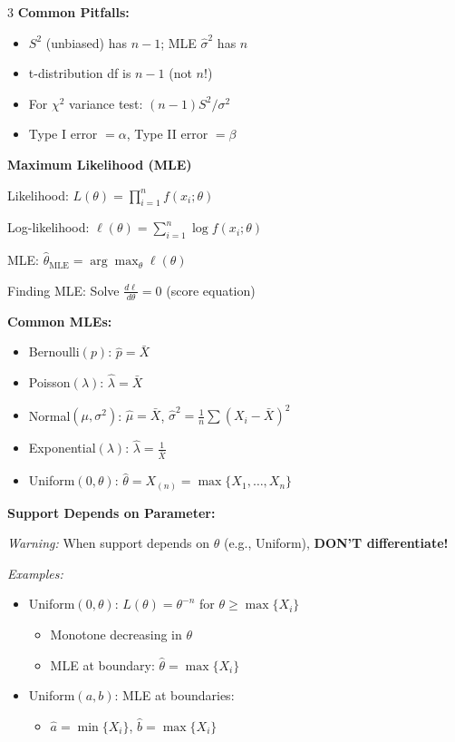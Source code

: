 \documentclass[10pt,letterpaper]{article}
\begin{document}
\begin{multicols}{3}
\textbf{Common Pitfalls:}
\begin{itemize}
\item $S^2$ (unbiased) has $n-1$; MLE $\hat{\sigma}^2$ has $n$
\item t-distribution df is $n-1$ (not $n$!)
\item For $\chi^2$ variance test: $(n-1)S^2/\sigma^2$
\item Type I error $= \alpha$, Type II error $= \beta$
\end{itemize}

\textbf{Maximum Likelihood (MLE)}

Likelihood: $L(\theta) = \prod_{i=1}^n f(x_i; \theta)$

Log-likelihood: $\ell(\theta) = \sum_{i=1}^n \log f(x_i; \theta)$

MLE: $\hat{\theta}_{\text{MLE}} = \arg\max_{\theta} \ell(\theta)$

Finding MLE: Solve $\frac{d\ell}{d\theta} = 0$ (score equation)

\textbf{Common MLEs:}
\begin{itemize}
\item Bernoulli$(p)$: $\hat{p} = \bar{X}$
\item Poisson$(\lambda)$: $\hat{\lambda} = \bar{X}$
\item Normal$(\mu, \sigma^2)$: $\hat{\mu} = \bar{X}$, $\hat{\sigma}^2 = \frac{1}{n}\sum(X_i-\bar{X})^2$
\item Exponential$(\lambda)$: $\hat{\lambda} = \frac{1}{\bar{X}}$
\item Uniform$(0, \theta)$: $\hat{\theta} = X_{(n)} = \max\{X_1, \ldots, X_n\}$
\end{itemize}

\textbf{Support Depends on Parameter:}

\textit{Warning:} When support depends on $\theta$ (e.g., Uniform), \textbf{DON'T differentiate!}

\textit{Examples:}
\begin{itemize}
\item Uniform$(0,\theta)$: $L(\theta) = \theta^{-n}$ for $\theta \ge \max\{X_i\}$
  \begin{itemize}
  \item Monotone decreasing in $\theta$
  \item MLE at boundary: $\hat{\theta} = \max\{X_i\}$
  \end{itemize}
\item Uniform$(a,b)$: MLE at boundaries:
  \begin{itemize}
  \item $\hat{a} = \min\{X_i\}$, $\hat{b} = \max\{X_i\}$
  \end{itemize}
\end{itemize}


\end{multicols}
\end{document}
